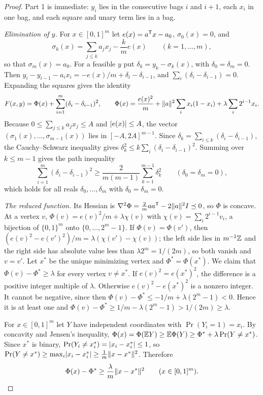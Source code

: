 \begin{proof}
Part 1 is immediate: $y_i$ lies in the consecutive bags $i$ and $i+1$, each
$x_i$ in one bag, and each square and unary term lies in a bag.

\emph{Elimination of $y$.} For $x\in[0,1]^m$ let
$e(x)=a^{\mathsf T}x-a_0$, $\sigma_0(x)=0$, and
\[
\sigma_k(x)=\sum_{j\le k}a_jx_j-\frac kme(x)\qquad(k=1,\ldots,m),
\]
so that $\sigma_m(x)=a_0$. For a feasible $y$ put $\delta_k=y_k-\sigma_k(x)$,
with $\delta_0=\delta_m=0$. Then
$y_i-y_{i-1}-a_ix_i=-e(x)/m+\delta_i-\delta_{i-1}$, and
$\sum_i(\delta_i-\delta_{i-1})=0$. Expanding the squares gives the identity
\begin{equation}\label{lim:eq:split}
F(x,y)=\Phi(x)+\sum_{i=1}^m(\delta_i-\delta_{i-1})^2,\qquad
\Phi(x)=\frac{e(x)^2}m+\lVert a\rVert^2\sum_ix_i(1-x_i)+\lambda\sum_i2^{i-1}x_i .
\end{equation}
Because $0\le\sum_{j\le k}a_jx_j\le A$ and $\lvert e(x)\rvert\le A$, the vector
$(\sigma_1(x),\ldots,\sigma_{m-1}(x))$ lies in $[-A,2A]^{m-1}$.
Since $\delta_k=\sum_{i\le k}(\delta_i-\delta_{i-1})$, the Cauchy--Schwarz
inequality gives $\delta_k^2\le k\sum_i(\delta_i-\delta_{i-1})^2$. Summing
over $k\le m-1$ gives the path inequality
\begin{equation}\label{lim:eq:path}
\sum_{i=1}^m(\delta_i-\delta_{i-1})^2\ge\frac2{m(m-1)}\sum_{k=1}^{m-1}
\delta_k^2\qquad(\delta_0=\delta_m=0),
\end{equation}
which holds for all reals $\delta_0,\ldots,\delta_m$ with $\delta_0=\delta_m=0$.

\emph{The reduced function.} Its Hessian is
$\nabla^2\Phi=\tfrac2maa^{\mathsf T}-2\lVert a\rVert^2I\preceq0$, so $\Phi$ is concave. At a
vertex $v$, $\Phi(v)=e(v)^2/m+\lambda\chi(v)$ with
$\chi(v)=\sum_i2^{i-1}v_i$, a bijection of $\{0,1\}^m$ onto
$\{0,\ldots,2^m-1\}$. If $\Phi(v)=\Phi(v')$, then
$(e(v)^2-e(v')^2)/m=\lambda(\chi(v')-\chi(v))$; the left side lies in
$m^{-1}\mathbb Z$ and the right side has absolute value less than
$\lambda2^m=1/(2m)$, so both vanish and $v=v'$. Let $x^*$ be the unique
minimizing vertex and $\Phi^*=\Phi(x^*)$. We claim that
$\Phi(v)-\Phi^*\ge\lambda$ for every vertex $v\ne x^*$. If
$e(v)^2=e(x^*)^2$, the difference is a positive integer multiple of
$\lambda$. Otherwise $e(v)^2-e(x^*)^2$ is a nonzero integer. It cannot be
negative, since then $\Phi(v)-\Phi^*\le-1/m+\lambda(2^m-1)<0$. Hence it
is at least one and $\Phi(v)-\Phi^*\ge1/m-\lambda(2^m-1)>1/(2m)\ge\lambda$.

For $x\in[0,1]^m$ let $Y$ have independent coordinates with
$\Pr(Y_i=1)=x_i$. By concavity and Jensen's inequality,
$\Phi(x)=\Phi(\mathbb E Y)\ge\mathbb E\Phi(Y)\ge\Phi^*+\lambda\Pr(Y\ne x^*)$. Since $x^*$ is
binary, $\Pr(Y_i\ne x_i^*)=\lvert x_i-x_i^*\rvert\le1$, so
$\Pr(Y\ne x^*)\ge\max_i\lvert x_i-x_i^*\rvert\ge\frac1m\lVert x-x^*\rVert^2$. Therefore
\begin{equation}\label{lim:eq:phigrowth}
\Phi(x)-\Phi^*\ge\frac\lambda m\lVert x-x^*\rVert^2\qquad(x\in[0,1]^m).
\end{equation}


\end{proof}
